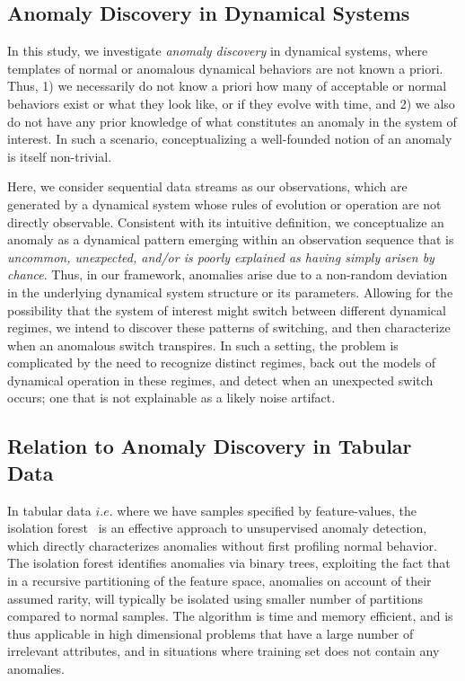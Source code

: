\documentclass[9pt,journal]{IEEEtran}
\begin{document}
{\subsection{Anomaly Discovery in Dynamical Systems}
  In this study,  we investigate \textit{anomaly discovery} in dynamical systems, where  templates of normal or anomalous dynamical behaviors are not known a priori. Thus, 1) we necessarily do not know a priori  how many of acceptable or normal behaviors exist or what they look like, or if they evolve with time, and 2) we also do not have any prior knowledge of what constitutes an anomaly  in the system of interest. In such a scenario, conceptualizing a well-founded notion of an anomaly is itself non-trivial.

  Here, we consider sequential data streams as our observations, which are generated by a  dynamical system whose rules of evolution or operation are not directly observable. Consistent with its intuitive definition, we conceptualize an anomaly as a dynamical pattern emerging within an observation sequence that is \textit{uncommon, unexpected, and/or is poorly explained as having simply arisen by chance}.
  Thus, in our framework, anomalies  arise due to a non-random  deviation in the   underlying dynamical system structure or its parameters. Allowing for the possibility that the system of interest might switch between different dynamical regimes, we intend to discover these patterns of switching, and then characterize when an anomalous switch transpires. In such a setting, the problem is  complicated by the need to recognize distinct regimes,  back out the models of dynamical operation in these regimes, and detect when an unexpected switch occurs; one that is not explainable as a likely noise artifact.

  \subsection{Relation to Anomaly Discovery in Tabular Data}
  In tabular data $i.e.$ where we have samples specified by feature-values, the isolation forest~\cite{liu2008isolation} is an effective approach to unsupervised anomaly detection, which directly characterizes anomalies  without first profiling normal behavior. The isolation forest  identifies anomalies via binary trees, exploiting the fact that in a recursive partitioning of the feature space, anomalies on account of their assumed rarity, will typically be isolated using smaller number of partitions compared to normal samples. The algorithm is  time and memory efficient, and is thus applicable  in high dimensional problems that have a large number of irrelevant attributes, and in situations where training set does not contain any anomalies.

}
\end{document}
